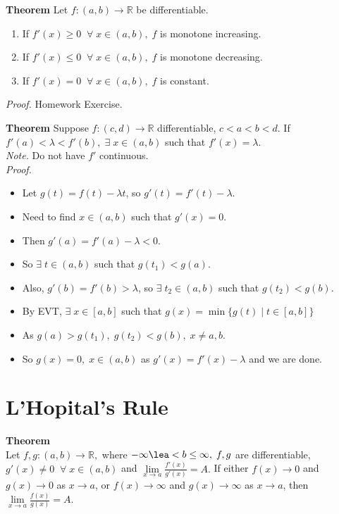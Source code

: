 \documentclass[12pt]{article}
\begin{document}
\vspace{1\baselineskip}
{\bf Theorem} Let $f\colon (a,b)\to\mathbb{R}$ be differentiable.

\begin{enumerate}[label=(\roman*)]
  \item If $f'(x)\ge 0\;\;\forall\;x\in(a,b),\; f$ is monotone increasing.
  \item If $f'(x)\le 0\;\;\forall\;x\in(a,b),\; f$ is monotone decreasing.
  \item If $f'(x)=0\;\;\forall\;x\in(a,b),\; f$ is constant.\\
\end{enumerate}

{\sl Proof.} Homework Exercise.

\vspace{1\baselineskip}
{\bf Theorem} Suppose $f\colon(c,d)\to \mathbb{R}$ differentiable, $c<a<b<d$. If $f'(a) < \lambda < f'(b),\;\exists\;x\in(a,b)$ such that $f'(x)=\lambda$.\\

{\sl Note.} Do not have $f'$ continuous.\\

{\sl Proof.} 
\begin{itemize}
  \item Let $g(t)=f(t)-\lambda t$, so $g'(t)=f'(t)-\lambda.$
  \item Need to find $x\in (a,b)$ such that $g'(x)=0$.
  \item Then $g'(a) = f'(a)-\lambda <0$.
  \item So $\exists\;t\in(a,b)$ such that $g(t_1)<g(a)$.
  \item Also, $g'(b)=f'(b)>\lambda$, so $\exists\; t_2\in(a,b)$ such that $g(t_2)<g(b)$. 
  \item By EVT, $\exists\; x\in[a,b]$ such that $g(x)=\min\{g(t)\;|\;t\in[a,b]\}$
  \item As $g(a)>g(t_1),\;g(t_2)<g(b),\; x\neq a,b$.
  \item So $g(x)=0,\;x\in(a,b)$ as $g'(x)=f'(x)-\lambda$ and we are done.
\end{itemize}
  


\section{L'Hopital's Rule}
{\bf Theorem}\\
Let $f,g\colon(a,b)\to\mathbb{R},$ where $-\infty\lea<b\le \infty,\; f,g$ are differentiable, $g'(x)\neq0\;\;\forall\;x\in(a,b)$ and $\lim\limits_{x\to a} \frac{f'(x)}{g'(x)}=A.$
If either $f(x)\to 0$ and $g(x)\to 0$ as $x\to a$, or $f(x)\to \infty$ and $g(x)\to \infty$ as $x\to a$, then $\lim\limits_{x\to a}\frac{f(x)}{g(x)}=A.$
\end{document}
